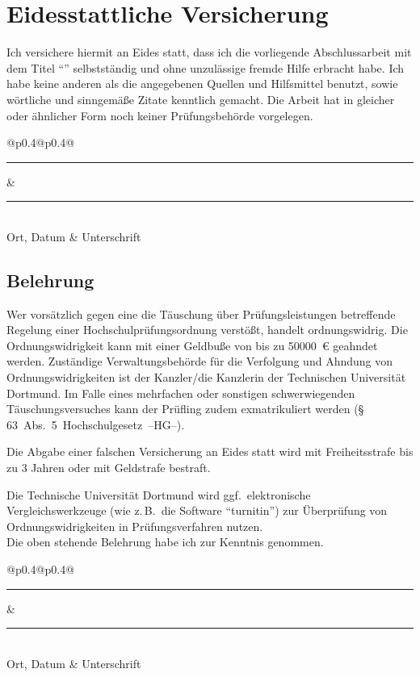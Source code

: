 \thispagestyle{empty}
\section*{Eidesstattliche Versicherung}
Ich versichere hiermit an Eides statt, dass ich die vorliegende Abschlussarbeit mit dem Titel \enquote{\thetitle} selbstständig und ohne unzulässige fremde Hilfe erbracht habe.
Ich habe keine anderen als die angegebenen Quellen und Hilfsmittel benutzt, sowie wörtliche und sinngemäße Zitate kenntlich gemacht. 
Die Arbeit hat in gleicher oder ähnlicher Form noch keiner Prüfungsbehörde vorgelegen.

\vspace*{1cm}\noindent
\begin{tabular}{@{}p{0.4\textwidth}@{\hspace{0.2\textwidth}}p{0.4\textwidth}@{}}
\rule{\linewidth}{0.25pt}& \rule{\linewidth}{0.25pt}\\
Ort, Datum & Unterschrift
\end{tabular}

\subsection*{Belehrung}
Wer vorsätzlich gegen eine die Täuschung über Prüfungsleistungen betreffende Regelung einer Hochschulprüfungsordnung verstößt, handelt ordnungswidrig.
Die Ordnungswidrigkeit kann mit einer Geldbuße von bis zu \SI[round-mode=places, round-precision=2]{50000}{€} geahndet werden. 
Zuständige Verwaltungsbehörde für die Verfolgung und Ahndung von Ordnungswidrigkeiten ist der Kanzler/die Kanzlerin der Technischen Universität Dortmund. 
Im Falle eines mehrfachen oder sonstigen schwerwiegenden Täuschungsversuches kann der Prüfling zudem exmatrikuliert werden \mbox{(\S\,63 Abs. 5 Hochschulgesetz --HG--).}

Die Abgabe einer falschen Versicherung an Eides statt wird mit Freiheitsstrafe bis zu 3 Jahren oder mit Geldstrafe bestraft.

Die Technische Universität Dortmund wird ggf.\ elektronische Vergleichswerkzeuge (wie z.\,B.\ die Software \enquote{turnitin}) zur Überprüfung von Ordnungswidrigkeiten in Prüfungsverfahren nutzen. \\[\baselineskip]

\noindent Die oben stehende Belehrung habe ich zur Kenntnis genommen.\\[1cm]
\begin{tabular}{@{}p{0.4\textwidth}@{\hspace{0.2\textwidth}}p{0.4\textwidth}@{}}
\rule{\linewidth}{0.25pt}& \rule{\linewidth}{0.25pt}\\
Ort, Datum & Unterschrift
\end{tabular}
